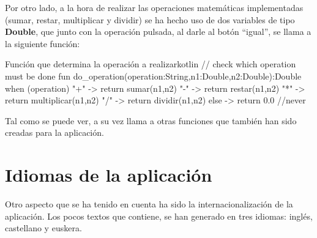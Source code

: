 \documentclass{\ClassPath/viu-tfm-template}
\begin{document}
Por otro lado, a la hora de realizar las operaciones matemáticas implementadas (sumar, restar, multiplicar y dividir) se ha hecho uso de dos variables de tipo \textbf{Double}, que junto con la operación pulsada, al darle al botón “igual”, se llama a la siguiente función:

\begin{mycode}{Función que determina la operación a realizar}{kotlin}{}
// check which operation must be done
fun do_operation(operation:String,n1:Double,n2:Double):Double{
    when (operation){
        "+" -> return sumar(n1,n2)
        "-" -> return restar(n1,n2)
        "*" -> return multiplicar(n1,n2)
        "/" -> return dividir(n1,n2)
        else -> return 0.0 //never
    }
}
\end{mycode}

Tal como se puede ver, a su vez llama a otras funciones que también han sido creadas para la aplicación.

%
%
%



\section{Idiomas de la aplicación}
Otro aspecto que se ha tenido en cuenta ha sido la internacionalización de la aplicación. Los pocos textos que contiene, se han generado en tres idiomas: inglés, castellano y euskera.
\end{document}
